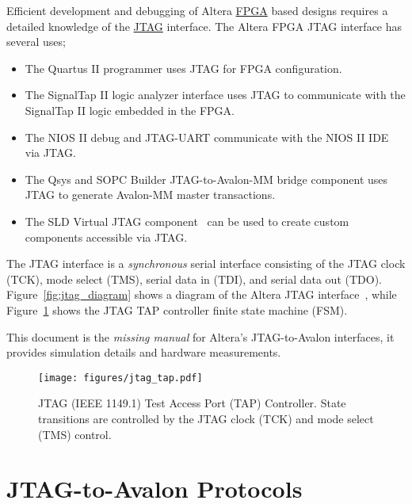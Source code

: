 \documentclass[10pt,twoside]{article}
\begin{document}
Efficient development and debugging of Altera
\href{http://en.wikipedia.org/wiki/Fpga}{FPGA} based
designs requires a detailed knowledge of the
\href{http://en.wikipedia.org/wiki/Jtag}{JTAG} interface.
The Altera FPGA JTAG interface has several uses;
%
\begin{itemize}
\item The Quartus II programmer uses JTAG for FPGA configuration.
\item The SignalTap II logic analyzer interface uses JTAG to communicate
with the SignalTap II logic embedded in the FPGA.
\item The NIOS II debug and JTAG-UART communicate with the NIOS II IDE
via JTAG.
\item The Qsys and SOPC Builder JTAG-to-Avalon-MM bridge component uses
JTAG to generate Avalon-MM master transactions.
\item The SLD Virtual JTAG component~\cite{Altera_Virtual_JTAG_2008}
can be used to create custom components accessible via JTAG.
\end{itemize}
%
The JTAG interface is a {\em synchronous} serial interface consisting of
the JTAG clock (TCK), mode select (TMS), serial data in (TDI), and
serial data out (TDO).
Figure~\ref{fig:jtag_diagram} shows a diagram of the Altera JTAG
interface~\cite{Altera_JTAG_Configuration}, while 
Figure~\ref{fig:jtag_tap} shows the JTAG TAP controller
finite state machine (FSM). 

This document is the {\em missing manual} for Altera's JTAG-to-Avalon
interfaces, it provides simulation details and hardware measurements.

%
\begin{figure}
  \begin{center}
    \texttt{[image: figures/jtag\_tap.pdf]}
  \end{center}
  \caption{JTAG (IEEE 1149.1) Test Access Port (TAP) Controller.
  State transitions are controlled by the JTAG clock (TCK) and
  mode select (TMS) control.}
  \label{fig:jtag_tap}
\end{figure}

\clearpage
\section{JTAG-to-Avalon Protocols}
\label{sec:protocol}
\end{document}
